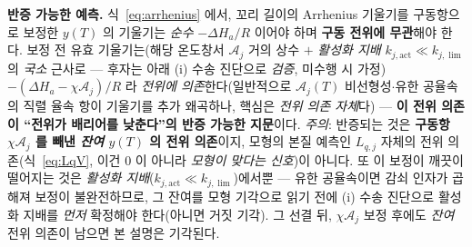 \documentclass[11pt,a4paper]{article}
\begin{document}
\textbf{반증 가능한 예측.} 식~\eqref{eq:arrhenius} 에서, 꼬리 길이의 Arrhenius 기울기를 구동항으로 보정한 $y(T)$
의 기울기는 \emph{순수} $-\Delta H_a/R$ 이어야 하며 \textbf{구동 전위에 무관}해야 한다. 보정 전 유효 기울기는(해당
온도창서 $\mathcal A_j$ 거의 상수 $+$ \emph{활성화 지배} $k_{j,\mathrm{act}}\ll k_{j,\lim}$ 의 \emph{국소} 근사로 — 후자는
아래 (i) 수송 진단으로 \emph{검증}, 미수행 시 가정) $-(\Delta H_a-\chi\mathcal A_j)/R$ 라 \emph{전위에 의존}한다(일반적으로 $\mathcal A_j(T)$
비선형성$\cdot$유한 공율속의 직렬 율속 항이 기울기를 추가 왜곡하나, 핵심은 \emph{전위 의존 자체}다) — \textbf{이 전위
의존이 ``전위가 배리어를 낮춘다''의 반증 가능한 지문}이다. \emph{주의}: 반증되는 것은 \textbf{구동항 $\chi\mathcal A_j$ 를
빼낸 \emph{잔여} $y(T)$ 의 전위 의존}이지, 모형의 본질 예측인 $L_{q,j}$ 자체의 전위 의존(식~\eqref{eq:LqV}, 이건 $0$ 이
아니라 \emph{모형이 맞다는 신호})이 아니다. 또 이 보정이 깨끗이 떨어지는 것은 \emph{활성화 지배}($k_{j,\mathrm{act}}\ll
k_{j,\lim}$)에서뿐 — 유한 공율속이면 감쇠 인자가 곱해져 보정이 불완전하므로, 그 잔여를 모형 기각으로 읽기 전에 (i)
수송 진단으로 활성화 지배를 \emph{먼저} 확정해야 한다(아니면 거짓 기각). 그 선결 뒤, $\chi\mathcal A_j$ 보정 후에도
\emph{잔여} 전위 의존이 남으면 본 설명은 기각된다.
\end{document}
